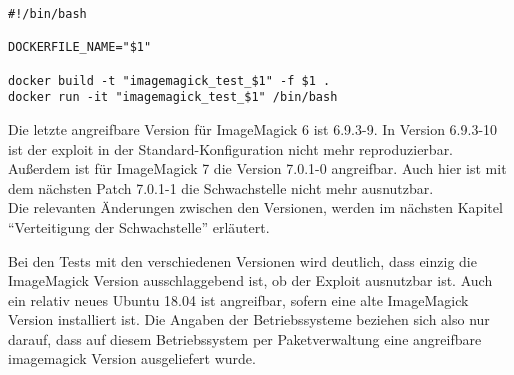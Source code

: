 \begin{lstlisting}[language=Text, caption=Script debug.sh in Testsuite,label={lst:testsuitedebugcall}]
#!/bin/bash

DOCKERFILE_NAME="$1"

docker build -t "imagemagick_test_$1" -f $1 .
docker run -it "imagemagick_test_$1" /bin/bash
\end{lstlisting}
\vspace{5mm}


Die letzte angreifbare Version für ImageMagick 6 ist 6.9.3-9.
In Version 6.9.3-10 ist der exploit in der Standard-Konfiguration nicht mehr reproduzierbar.
Außerdem ist für ImageMagick 7 die Version 7.0.1-0 angreifbar.
Auch hier ist mit dem nächsten Patch 7.0.1-1 die Schwachstelle nicht mehr ausnutzbar.\\
Die relevanten Änderungen zwischen den Versionen, werden im nächsten Kapitel "`Verteitigung der Schwachstelle"' erläutert.

Bei den Tests mit den verschiedenen Versionen wird deutlich, dass einzig die ImageMagick Version ausschlaggebend ist,
ob der Exploit ausnutzbar ist.
Auch ein relativ neues Ubuntu 18.04 ist angreifbar, sofern eine alte ImageMagick Version installiert ist.
Die Angaben der Betriebssysteme beziehen sich also nur darauf,
dass auf diesem Betriebssystem per Paketverwaltung eine angreifbare imagemagick Version ausgeliefert wurde.\\